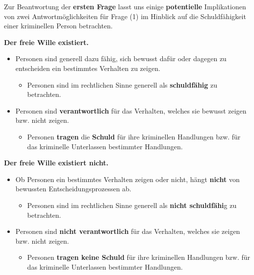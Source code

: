\documentclass[
  a4paper,
]{report}
\providecommand{\tightlist}{%
  \setlength{\itemsep}{0pt}\setlength{\parskip}{0pt}}
\begin{document}
Zur Beantwortung der \textbf{ersten Frage} lasst uns einige \textbf{potentielle} Implikationen von zwei Antwortmöglichkeiten für Frage (1) im Hinblick auf die Schuldfähigkeit einer kriminellen Person betrachten.

\textbf{Der freie Wille existiert.}

\begin{itemize}
\item
  Personen sind generell dazu fähig, sich bewusst dafür oder dagegen zu entscheiden ein bestimmtes Verhalten zu zeigen.

  \begin{itemize}
  \tightlist
  \item
    Personen sind im rechtlichen Sinne generell als \textbf{schuldfähig} zu betrachten.
  \end{itemize}
\item
  Personen sind \textbf{verantwortlich} für das Verhalten, welches sie bewusst zeigen bzw. nicht zeigen.

  \begin{itemize}
  \tightlist
  \item
    Personen \textbf{tragen} die \textbf{Schuld} für ihre kriminellen Handlungen bzw. für das kriminelle Unterlassen bestimmter Handlungen.
  \end{itemize}
\end{itemize}

\textbf{Der freie Wille existiert nicht.}

\begin{itemize}
\item
  Ob Personen ein bestimmtes Verhalten zeigen oder nicht, hängt \textbf{nicht} von bewussten Entscheidungsprozessen ab.

  \begin{itemize}
  \tightlist
  \item
    Personen sind im rechtlichen Sinne generell als \textbf{nicht schuldfähi}g zu betrachten.
  \end{itemize}
\item
  Personen sind \textbf{nicht verantwortlich} für das Verhalten, welches sie zeigen bzw. nicht zeigen.

  \begin{itemize}
  \tightlist
  \item
    Personen \textbf{tragen keine Schuld} für ihre kriminellen Handlungen bzw. für das kriminelle Unterlassen bestimmter Handlungen.
  \end{itemize}
\end{itemize}
\end{document}
